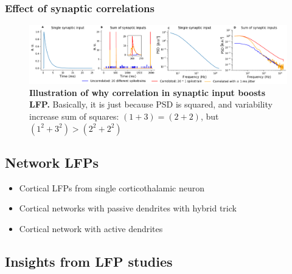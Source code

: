 \subsubsection{Effect of synaptic correlations}
\begin{figure}[!ht]
\begin{center}
\includegraphics[width=1.\textwidth]{Figures/LFP_effect_correlation_illustration.png}
\end{center}
\caption{\textbf{Illustration of why correlation in synaptic input boosts LFP.}
Basically, it is just because PSD is squared, and variability increase sum of squares: $(1+3) = (2 +2)$, but $(1^2 + 3^2) > (2^2 + 2^2)$
}
\label{fig:correlation_boost}
\end{figure}


\subsection{Network LFPs}
\begin{itemize}
\item Cortical LFPs from single corticothalamic neuron \citep{Hagen2017}
\item Cortical networks with passive dendrites with hybrid trick \citep{Hagen2016}
\item Cortical network with active dendrites \citep{Reimann2013}
\end{itemize}

\subsection{Insights from LFP studies} 

